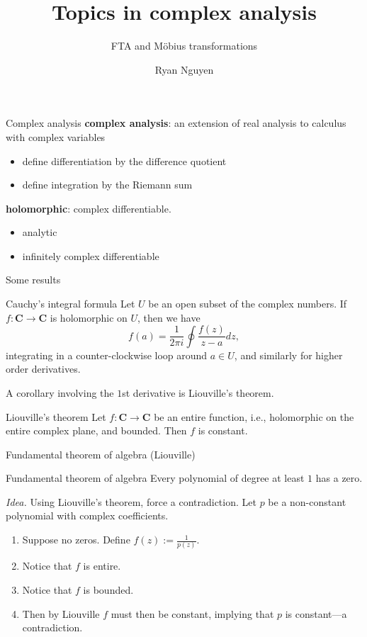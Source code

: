 \documentclass{beamer}
\title[Complex analysis]{Topics in complex analysis}
\subtitle{FTA and M\"{o}bius transformations}
\author{Ryan Nguyen}
\institute{}
\date{}
\begin{document}

\begin{frame}
\titlepage
\end{frame}

\begin{frame}[t]{Complex analysis} \vspace{4pt}
\textbf{complex analysis}: an extension of real analysis to calculus with complex variables
\begin{itemize}
	\item define differentiation by the difference quotient
	\item define integration by the Riemann sum
\end{itemize}
\textbf{holomorphic}: complex differentiable.
\begin{itemize}
	\item analytic
	\item infinitely complex differentiable
\end{itemize}
\end{frame}

\begin{frame}[t]{Some results} \vspace{3pt}
\begin{block}{Cauchy's integral formula}
Let \(U\) be an open subset of the complex numbers. If \(f: \mathbf{C} \rightarrow \mathbf{C}\) is holomorphic on \(U\), then we have
\begin{equation*}
f(a) = \frac{1}{2\pi i} \oint \frac{f(z)}{z-a} dz,
\end{equation*}
integrating in a counter-clockwise loop around \(a \in U\), and similarly for higher order derivatives.
\end{block}
A corollary involving the \(1\)st derivative is Liouville's theorem.
\begin{block}{Liouville's theorem}
Let \(f: \mathbf{C} \rightarrow \mathbf{C}\) be an entire function, i.e., holomorphic on the entire complex plane, and bounded. Then \(f\) is constant.
\end{block}
\end{frame}

\begin{frame}[t]{Fundamental theorem of algebra (Liouville)} \vspace{4pt}
\begin{block}{Fundamental theorem of algebra}
Every polynomial of degree at least \(1\) has a zero.
\end{block}
\textit{Idea.} Using Liouville's theorem, force a contradiction. Let \(p\) be a non-constant polynomial with complex coefficients.
\begin{enumerate}
	\item Suppose no zeros. Define \(f(z) := \frac{1}{p(z)}\).
	\item Notice that \(f\) is entire.
	\item Notice that \(f\) is bounded.
	\item Then by Liouville \(f\) must then be constant, implying that \(p\) is constant---a contradiction.
\end{enumerate}
\end{frame}
\end{document}
